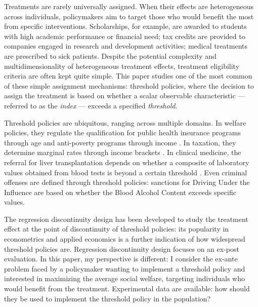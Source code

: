 {Treatments are rarely universally assigned. When their effects are heterogeneous across individuals, policymakers aim to target those who would benefit the most from specific interventions. Scholarships, for example, are awarded to students with high academic performance or financial need; tax credits are provided to companies engaged in research and development activities; medical treatments are prescribed to sick patients. Despite the potential complexity and multidimensionality of heterogeneous treatment effects, treatment eligibility criteria are often kept quite simple. This paper studies one of the most common of these simple assignment mechanisms: threshold policies, where the decision to assign the treatment is based on whether a scalar observable characteristic — referred to as the \textit{index} — exceeds a specified \textit{threshold}.

Threshold policies are ubiquitous, ranging across multiple domains. In welfare policies, they regulate the qualification for public health insurance programs through age \citep{card2008impact,shigeoka2014effect} and anti-poverty programs through income \citep{crost2014aid}. In taxation, they determine marginal rates through income brackets \citep{taylor2003corporation}. In clinical medicine, the referral for liver transplantation depends on whether a composite of laboratory values obtained from blood tests is beyond a certain threshold \citep{kamath2007model}. Even criminal offenses are defined through threshold policies: sanctions for Driving Under the Influence are based on whether the Blood Alcohol Content exceeds specific values.

The regression discontinuity design has been developed to study the treatment effect at the point of discontinuity of threshold policies: its popularity in econometrics and applied economics is a further indication of how widespread threshold policies are. Regression discontinuity design focuses on an ex-post evaluation. In this paper, my perspective is different: I consider the ex-ante problem faced by a policymaker wanting to implement a threshold policy and interested in maximizing the average social welfare, targeting individuals who would benefit from the treatment. Experimental data are available: how should they be used to implement the threshold policy in the population?

}
